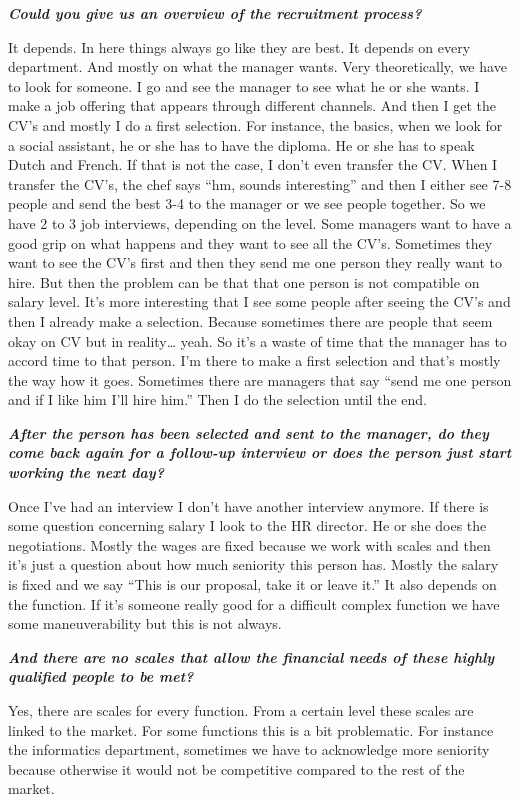 \documentclass[a4paper,fleqn,11pt,dvips,titlepage]{article}
\newcommand{\question}[1]{\textbf{\textit{#1}}}
\numberwithin{figure}{section}
\numberwithin{equation}{section}
\begin{document}
\question{Could you give us an overview of the recruitment process?}

It depends. In here things always go like they are best. It depends on every department. And mostly on what the manager wants. Very theoretically, we have to look for someone. I go and see the manager to see what he or she wants. I make a job offering that appears through different channels. And then I get the CV’s and mostly I do a first selection. For instance, the basics, when we look for a social assistant, he or she has to have the diploma. He or she has to speak Dutch and French. If that is not the case, I don’t even transfer the CV. When I transfer the CV’s, the chef says “hm, sounds interesting” and then I either see 7-8 people and send the best 3-4 to the manager or we see people together. So we have 2 to 3 job interviews, depending on the level. Some managers want to have a good grip on what happens and they want to see all the CV’s. Sometimes they want to see the CV’s first and then they send me one person they really want to hire. But then the problem can be that that one person is not compatible on salary level. It’s more interesting that I see some people after seeing the CV’s and then I already make a selection. Because sometimes there are people that seem okay on CV but in reality… yeah. So it’s a waste of time that the manager has to accord time to that person. I’m there to make a first selection and that’s mostly the way how it goes. Sometimes there are managers that say “send me one person and if I like him I’ll hire him.” Then I do the selection until the end. 

\question{After the person has been selected and sent to the manager, do they come back again for a follow-up interview or does the person just start working the next day?}

Once I’ve had an interview I don’t have another interview anymore. If there is some question concerning salary I look to the HR director. He or she does the negotiations. Mostly the wages are fixed because we work with scales and then it’s just a question about how much seniority this person has. Mostly the salary is fixed and we say “This is our proposal, take it or leave it.” It also depends on the function. If it’s someone really good for a difficult complex function we have some maneuverability but this is not always. 

\question{And there are no scales that allow the financial needs of these highly qualified people to be met? }

Yes, there are scales for every function. From a certain level these scales are linked to the market. For some functions this is a bit problematic. For instance the informatics department, sometimes we have to acknowledge more seniority because otherwise it would not be competitive compared to the rest of the market. 
\end{document}
